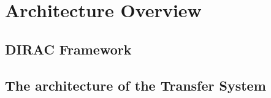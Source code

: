 \section{Architecture Overview}

\subsection{DIRAC Framework}

\subsection{The architecture of the Transfer System}
